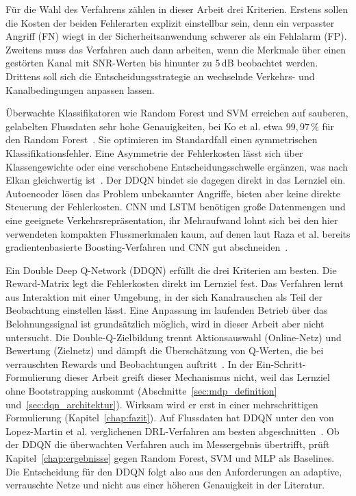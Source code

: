 Für die Wahl des Verfahrens zählen in dieser Arbeit drei Kriterien. Erstens sollen die Kosten der beiden Fehlerarten explizit einstellbar sein, denn ein verpasster Angriff (FN) wiegt in der Sicherheitsanwendung schwerer als ein Fehlalarm (FP). Zweitens muss das Verfahren auch dann arbeiten, wenn die Merkmale über einen gestörten Kanal mit SNR-Werten bis hinunter zu 5\,dB beobachtet werden. Drittens soll sich die Entscheidungsstrategie an wechselnde Verkehrs- und Kanalbedingungen anpassen lassen.

Überwachte Klassifikatoren wie Random Forest und SVM erreichen auf sauberen, gelabelten Flussdaten sehr hohe Genauigkeiten, bei Ko et al. etwa $99{,}97\,\%$ für den Random Forest~\autocite{koComparativeStudyAIEnabled2023}. Sie optimieren im Standardfall einen symmetrischen Klassifikationsfehler. Eine Asymmetrie der Fehlerkosten lässt sich über Klassengewichte oder eine verschobene Entscheidungsschwelle ergänzen, was nach Elkan gleichwertig ist~\autocite{elkanFoundationsCostSensitiveLearning2001}. Der DDQN bindet sie dagegen direkt in das Lernziel ein. Autoencoder lösen das Problem unbekannter Angriffe, bieten aber keine direkte Steuerung der Fehlerkosten. CNN und LSTM benötigen große Datenmengen und eine geeignete Verkehrsrepräsentation, ihr Mehraufwand lohnt sich bei den hier verwendeten kompakten Flussmerkmalen kaum, auf denen laut Raza et al. bereits gradientenbasierte Boosting-Verfahren und CNN gut abschneiden~\autocite{razaFeatureSelectionBasedDDoSAttack2024}.

Ein Double Deep Q-Network (DDQN) erfüllt die drei Kriterien am besten. Die Reward-Matrix legt die Fehlerkosten direkt im Lernziel fest. Das Verfahren lernt aus Interaktion mit einer Umgebung, in der sich Kanalrauschen als Teil der Beobachtung einstellen lässt. Eine Anpassung im laufenden Betrieb über das Belohnungssignal ist grundsätzlich möglich, wird in dieser Arbeit aber nicht untersucht. Die Double-Q-Zielbildung trennt Aktionsauswahl (Online-Netz) und Bewertung (Zielnetz) und dämpft die Überschätzung von Q-Werten, die bei verrauschten Rewards und Beobachtungen auftritt~\autocite{vanhasseltDeepReinforcementLearning2016}. In der Ein-Schritt-Formulierung dieser Arbeit greift dieser Mechanismus nicht, weil das Lernziel ohne Bootstrapping auskommt (Abschnitte~\ref{sec:mdp_definition} und~\ref{sec:dqn_architektur}). Wirksam wird er erst in einer mehrschrittigen Formulierung (Kapitel~\ref{chap:fazit}). Auf Flussdaten hat DDQN unter den von Lopez-Martin et al. verglichenen DRL-Verfahren am besten abgeschnitten~\autocite{lopez-martinApplicationDeepReinforcement2020}. Ob der DDQN die überwachten Verfahren auch im Messergebnis übertrifft, prüft Kapitel~\ref{chap:ergebnisse} gegen Random Forest, SVM und MLP als Baselines. Die Entscheidung für den DDQN folgt also aus den Anforderungen an adaptive, verrauschte Netze und nicht aus einer höheren Genauigkeit in der Literatur.


